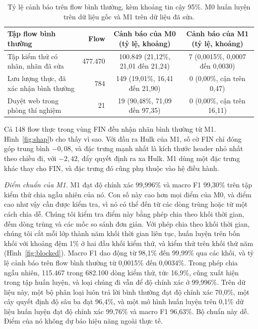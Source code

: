 \documentclass[conference]{IEEEtran}
\begin{document}
\begin{table}[t]
\caption{Tỷ lệ cảnh báo trên flow bình thường, kèm khoảng tin cậy 95\%. M0 huấn luyện trên dữ liệu gốc và M1 trên dữ liệu đã sửa.}
\label{tab:alert}
\centering
\small
\begin{tabular}{lrcc}
\toprule
Tập flow bình thường & Flow & Cảnh báo của M0 (tỷ lệ, khoảng) & Cảnh báo của M1 (tỷ lệ, khoảng) \\
\midrule
Tập kiểm thử có nhãn, nhãn đã sửa & 477.470 & 100.849 (21,12\%, 21,01 đến 21,24) & 7 (0,0015\%, 0,0007 đến 0,0030) \\
Lưu lượng thực, đã xác nhận bình thường & 784 & 149 (19,01\%, 16,41 đến 21,90) & 0 (0,00\%, cận trên 0,47) \\
Duyệt web trong phòng thí nghiệm & 21 & 19 (90,48\%, 71,09 đến 97,35) & 0 (0,00\%, cận trên 16,11) \\
\bottomrule
\end{tabular}
\end{table}

Cả 148 flow thực trong vùng FIN đều nhận nhãn bình thường từ M1. Hình~\ref{fig:shap}b cho thấy vì sao. Với đầu ra Hulk của M1, số cờ FIN chỉ đóng góp trung bình $-0{,}08$, và đặc trưng mạnh nhất là kích thước header nhỏ nhất theo chiều đi, với $-2{,}42$, đẩy quyết định ra xa Hulk. M1 dùng một đặc trưng khác thay cho FIN, và đặc trưng đó cũng phụ thuộc vào hệ điều hành.

\textit{Điểm chuẩn của M1.} M1 đạt độ chính xác 99,996\% và macro F1 99,30\% trên tập kiểm thử chia ngẫu nhiên của nó. Con số này cao hơn mọi điểm của M0, và điểm cao như vậy cần được kiểm tra, vì nó có thể đến từ các dòng trùng hoặc từ một cách chia dễ. Chúng tôi kiểm tra điểm này bằng phép chia theo khối thời gian, đếm dòng trùng và các mốc so sánh đơn giản. Với phép chia theo khối thời gian, chúng tôi cắt mỗi lớp thành năm khối thời gian liên tục, huấn luyện trên bốn khối với khoảng đệm 1\% ở hai đầu khối kiểm thử, và kiểm thử trên khối thứ năm (Hình~\ref{fig:blocked}). Macro F1 dao động từ 98,1\% đến 99,99\% qua các khối, và tỷ lệ cảnh báo trên flow bình thường từ 0,0015\% đến 0,0034\%. Trong phép chia ngẫu nhiên, 115.467 trong 682.100 dòng kiểm thử, tức 16,9\%, cũng xuất hiện trong tập huấn luyện, và loại chúng đi vẫn để độ chính xác ở 99,996\%. Trên dữ liệu này, một bộ phân loại luôn trả lời bình thường đạt độ chính xác 70,0\%, một cây quyết định độ sâu ba đạt 96,4\%, và một mô hình huấn luyện trên 0,1\% dữ liệu huấn luyện đạt độ chính xác 99,76\% và macro F1 96,63\%. Bộ chuẩn này dễ. Điểm của nó không dự báo hiệu năng ngoài thực tế.
\end{document}
